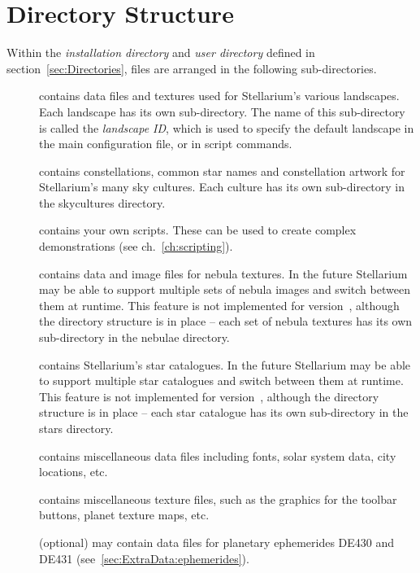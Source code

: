 \section{Directory Structure}
\label{sec:FilesAndDirectories:DirectoryStructure}

Within the \emph{installation directory} and \emph{user directory}
defined in section~\ref{sec:Directories}, files are arranged in the
following sub-directories.

\begin{description}
\item[] contains data files and textures used for
  Stellarium's various landscapes. Each landscape has its own
  sub-directory. The name of this sub-directory is called the
  \emph{landscape ID}, which is used to specify the default landscape in
  the main configuration file, or in script commands.
\item[] contains constellations, common star names and
  constellation artwork for Stellarium's many sky cultures. Each culture
  has its own sub-directory in the skycultures directory.
\item[] contains your own scripts. These can be used to create
  complex demonstrations (see ch.~\ref{ch:scripting}). 
\item[] contains data and image files for nebula textures.
  In the future Stellarium may be able to support multiple sets of nebula
  images and switch between them at runtime. This feature is not
  implemented for version~\StelVersion, although the directory structure is in
  place -- each set of nebula textures has its own sub-directory in the
  nebulae directory.
\item[] contains Stellarium's star catalogues. In the
  future Stellarium may be able to support multiple star catalogues
  and switch between them at runtime. This feature is not implemented
  for version~\StelVersion, although the directory structure is in
  place -- each star catalogue has its own sub-directory in the stars
  directory.
\item[] contains miscellaneous data files including fonts,
  solar system data, city locations, etc.
\item[] contains miscellaneous texture files, such as the
  graphics for the toolbar buttons, planet texture maps, etc.
\item[] (optional) may contain data files for planetary
  ephemerides DE430 and DE431 (see~\ref{sec:ExtraData:ephemerides}).
\end{description}

